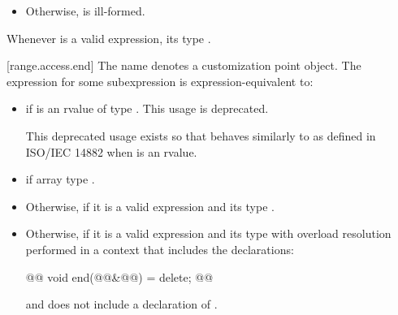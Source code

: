 {\begin{itemize}
\item
  Otherwise,  is ill-formed.
\end{itemize}

\pnum
\begin{note}
Whenever  is a valid expression, its
type   .
\end{note}

[range.access.end]{}
\pnum
The name  denotes a customization point
object. The expression
 for some subexpression  is expression-equivalent to:

\begin{itemize}
\item
  {\color{oldclr}
   if  is an rvalue of
  type . This usage is deprecated.
  \begin{note}
  This deprecated usage exists so that
   behaves similarly to 
  as defined in ISO/IEC 14882 when  is an rvalue.
  \end{note}
  } %

\item
   if
     array
  type .

\item
  Otherwise,  
  if it is a valid expression and its type  
  . 

\item
  Otherwise,  if it is a valid expression and
  its type   
   with overload
  resolution performed in a context that includes the declarations:
  \begin{codeblock}
  @@ void end(@@&@\newtxt{\&}@) = delete;
  @@
  \end{codeblock}
  and does not include
  a declaration of . 


\end{itemize}}
